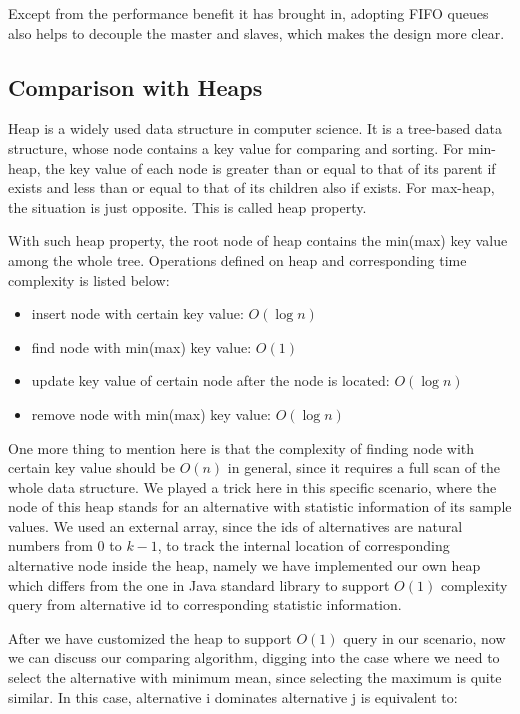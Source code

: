 \documentclass[12pt,a4paper]{report}
\begin{document}
Except from the performance benefit it has brought in, adopting FIFO queues also helps to decouple the master and slaves, which makes the design more clear.

\subsection{Comparison with Heaps}

Heap is a widely used data structure in computer science. It is a tree-based data structure, whose node contains a key value for comparing and sorting. For min-heap, the key value of each node is greater than or equal to that of its parent if exists and less than or equal to that of its children also if exists. For max-heap, the situation is just opposite. This is called heap property.

With such heap property, the root node of heap contains the min(max) key value among the whole tree. Operations defined on heap and corresponding time complexity is listed below:

\begin{itemize}
\item insert node with certain key value: $O(\log n)$
\item find node with min(max) key value: $O(1)$
\item update key value of certain node after the node is located: $O(\log n)$
\item remove node with min(max) key value: $O(\log n)$
\end{itemize}

One more thing to mention here is that the complexity of finding node with certain key value should be $O(n)$ in general, since it requires a full scan of the whole data structure. We played a trick here in this specific scenario, where the node of this heap stands for an alternative with statistic information of its sample values. We used an external array, since the ids of alternatives are natural numbers from $0$ to $k - 1$, to track the internal location of corresponding alternative node inside the heap, namely we have implemented our own heap which differs from the one in Java standard library to support $O(1)$ complexity query from alternative id to corresponding statistic information.

After we have customized the heap to support $O(1)$ query in our scenario, now we can discuss our comparing algorithm, digging into the case where we need to select the alternative with minimum mean, since selecting the maximum is quite similar. In this case, alternative i dominates alternative j is equivalent to:
\end{document}
